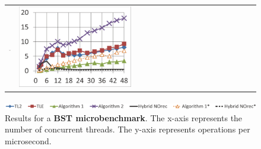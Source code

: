 \begin{figure}
\begin{minipage}{0.495\linewidth}
\begin{tabular}{m{0.04\linewidth}m{0.48\linewidth}m{0.48\linewidth}}
        \vspace{-5mm}\includegraphics[width=\linewidth]{figures/graphs/power8/20i20d10000k-nrq0.png} &
        \vspace{-5mm}\includegraphics[width=\linewidth]{figures/graphs/power8/20i20d10000k-nrq1.png}
        \\
    \end{tabular}
\end{minipage}
    \vspace{-2mm}
	\includegraphics[width=\linewidth]{figures/graphs/power8/dsbench3_legend_power.png}
    \vspace{-4mm}
\caption{Results for a \textbf{BST microbenchmark}.
The x-axis represents the number of concurrent threads.
The y-axis represents operations per microsecond.}
\label{fig-exp-bst}
\end{figure}

